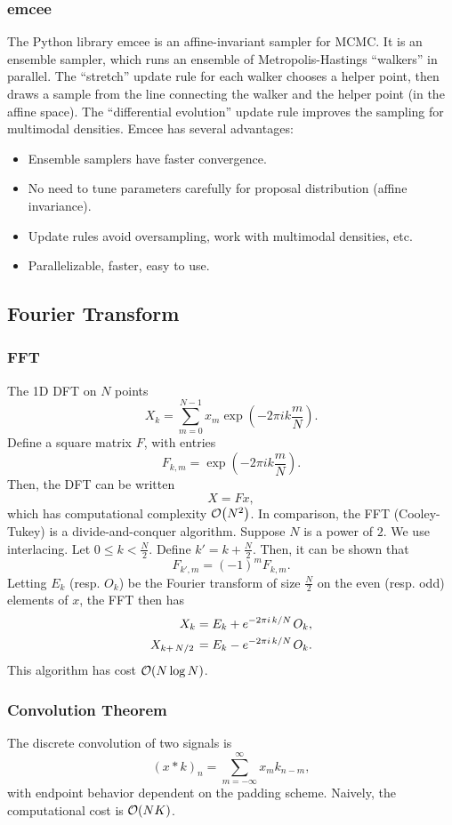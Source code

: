 \documentclass[12pt,letterpaper]{article}
\begin{document}
\subsubsection{emcee}
The Python library emcee is an affine-invariant sampler for MCMC. It is an ensemble sampler, which runs an ensemble of Metropolis-Hastings ``walkers'' in parallel. The ``stretch'' update rule for each walker chooses a helper point, then draws a sample from the line connecting the walker and the helper point (in the affine space). The ``differential evolution'' update rule improves the sampling for multimodal densities. Emcee has several advantages:
\begin{itemize}
    \item Ensemble samplers have faster convergence.
    \item No need to tune parameters carefully for proposal distribution (affine invariance).
    \item Update rules avoid oversampling, work with multimodal densities, etc.
    \item Parallelizable, faster, easy to use.
\end{itemize}
\subsection{Fourier Transform}
\subsubsection{FFT}
The 1D DFT on $N$ points
\[X_k=\sum_{m=0}^{N-1}x_m\exp(-2\pi ik\frac mN).\]
Define a square matrix $F$, with entries
\[F_{k,m}=\exp(-2\pi ik\frac mN).\]
Then, the DFT can be written
\[X=Fx,\]
which has computational complexity $\order{N^2}$. In comparison, the FFT (Cooley-Tukey) is a divide-and-conquer algorithm. Suppose $N$ is a power of $2$. We use interlacing. Let $0\leq k<\frac N2$. Define $k'=k+\frac N2$. Then, it can be shown that
\[F_{k',m}=(-1)^mF_{k,m}.\]
Letting $E_k$ (resp. $O_k$) be the Fourier transform of size $\frac N2$ on the even (resp. odd) elements of $x$, the FFT then has
\begin{align*}
    X_k&=E_k+e^{-2\pi i\flatfrac kN}O_k,\\
    X_{k+\flatfrac N2}&=E_k-e^{-2\pi i\flatfrac kN}O_k.
\end{align*}
This algorithm has cost $\order{N\log{N}}$.
\subsubsection{Convolution Theorem}
The discrete convolution of two signals is
\[(x*k)_n=\sum_{m=-\infty}^\infty x_mk_{n-m},\]
with endpoint behavior dependent on the padding scheme. Naively, the computational cost is $\order{NK}$.
\end{document}
